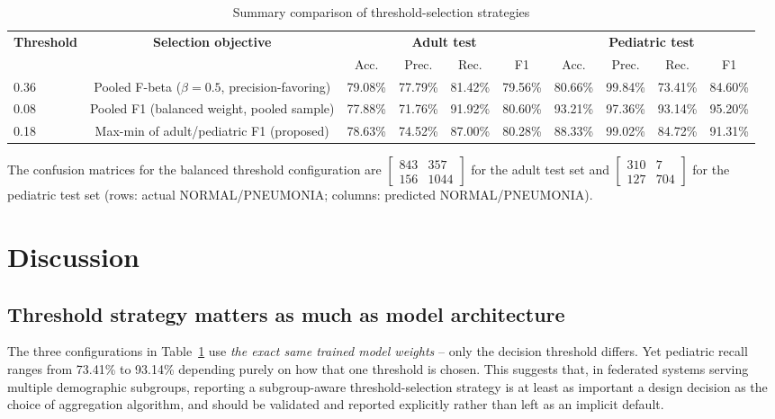 \documentclass[conference]{IEEEtran}
\begin{document}
\begin{table}[htbp]
\caption{Summary comparison of threshold-selection strategies}
\begin{center}
\begin{tabular}{lccccccccc}
\toprule
\multirow{2}{*}{\textbf{Threshold}} & \multirow{2}{*}{\textbf{Selection objective}} &
\multicolumn{4}{c}{\textbf{Adult test}} & \multicolumn{4}{c}{\textbf{Pediatric test}} \\
\cmidrule(lr){3-6} \cmidrule(lr){7-10}
 & & Acc. & Prec. & Rec. & F1 & Acc. & Prec. & Rec. & F1 \\
\midrule
0.36 & Pooled F-beta ($\beta=0.5$, precision-favoring) & 79.08\% & 77.79\% & 81.42\% & 79.56\% & 80.66\% & 99.84\% & 73.41\% & 84.60\% \\
0.08 & Pooled F1 (balanced weight, pooled sample) & 77.88\% & 71.76\% & 91.92\% & 80.60\% & 93.21\% & 97.36\% & 93.14\% & 95.20\% \\
0.18 & Max-min of adult/pediatric F1 (proposed) & 78.63\% & 74.52\% & 87.00\% & 80.28\% & 88.33\% & 99.02\% & 84.72\% & 91.31\% \\
\bottomrule
\end{tabular}
\label{tab:balanced-allages-summary}
\end{center}
\end{table}

The confusion matrices for the balanced threshold configuration are
$\begin{bmatrix}843 & 357\\156 & 1044\end{bmatrix}$ for the adult test set
and $\begin{bmatrix}310 & 7\\127 & 704\end{bmatrix}$ for the pediatric test
set (rows: actual NORMAL/PNEUMONIA; columns: predicted NORMAL/PNEUMONIA).

\section{Discussion}

\subsection{Threshold strategy matters as much as model architecture}

The three configurations in Table~\ref{tab:balanced-allages-summary} use
\emph{the exact same trained model weights} -- only the decision threshold
differs. Yet pediatric recall ranges from 73.41\% to 93.14\% depending
purely on how that one threshold is chosen. This suggests that, in
federated systems serving multiple demographic subgroups, reporting a
subgroup-aware threshold-selection strategy is at least as important a
design decision as the choice of aggregation algorithm, and should be
validated and reported explicitly rather than left as an implicit default.
\end{document}
